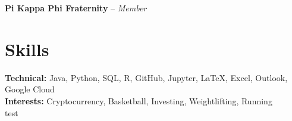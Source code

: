 \documentclass[11pt]{article}
\begin{document}
\vspace{0.1em}

\begin{adjustwidth}{0.5em}{0em}
\textbf{Pi Kappa Phi Fraternity} -- \textit{Member}
\end{adjustwidth}

\vspace{0.1em}


\section*{Skills}
\textbf{Technical:} Java, Python, SQL, R, GitHub, Jupyter, LaTeX, Excel, Outlook, Google Cloud\\ 
\textbf{Interests:} Cryptocurrency, Basketball, Investing, Weightlifting, Running \\
test
\end{document}
